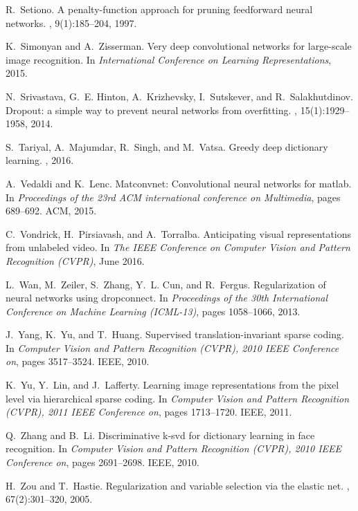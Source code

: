 \documentclass[10pt,twocolumn,letterpaper]{article}
\begin{document}
\begin{thebibliography}{10}
R.~Setiono.
\newblock A penalty-function approach for pruning feedforward neural networks.
, 9(1):185--204, 1997.

K.~Simonyan and A.~Zisserman.
\newblock Very deep convolutional networks for large-scale image recognition.
\newblock In {\em International Conference on Learning Representations}, 2015.

N.~Srivastava, G.~E. Hinton, A.~Krizhevsky, I.~Sutskever, and R.~Salakhutdinov.
\newblock Dropout: a simple way to prevent neural networks from overfitting.
, 15(1):1929--1958, 2014.

S.~Tariyal, A.~Majumdar, R.~Singh, and M.~Vatsa.
\newblock Greedy deep dictionary learning.
, 2016.

A.~Vedaldi and K.~Lenc.
\newblock Matconvnet: Convolutional neural networks for matlab.
\newblock In {\em Proceedings of the 23rd ACM international conference on
  Multimedia}, pages 689--692. ACM, 2015.

C.~Vondrick, H.~Pirsiavash, and A.~Torralba.
\newblock Anticipating visual representations from unlabeled video.
\newblock In {\em The IEEE Conference on Computer Vision and Pattern
  Recognition (CVPR)}, June 2016.

L.~Wan, M.~Zeiler, S.~Zhang, Y.~L. Cun, and R.~Fergus.
\newblock Regularization of neural networks using dropconnect.
\newblock In {\em Proceedings of the 30th International Conference on Machine
  Learning (ICML-13)}, pages 1058--1066, 2013.

J.~Yang, K.~Yu, and T.~Huang.
\newblock Supervised translation-invariant sparse coding.
\newblock In {\em Computer Vision and Pattern Recognition (CVPR), 2010 IEEE
  Conference on}, pages 3517--3524. IEEE, 2010.

K.~Yu, Y.~Lin, and J.~Lafferty.
\newblock Learning image representations from the pixel level via hierarchical
  sparse coding.
\newblock In {\em Computer Vision and Pattern Recognition (CVPR), 2011 IEEE
  Conference on}, pages 1713--1720. IEEE, 2011.

Q.~Zhang and B.~Li.
\newblock Discriminative k-svd for dictionary learning in face recognition.
\newblock In {\em Computer Vision and Pattern Recognition (CVPR), 2010 IEEE
  Conference on}, pages 2691--2698. IEEE, 2010.

H.~Zou and T.~Hastie.
\newblock Regularization and variable selection via the elastic net.
, 67(2):301--320, 2005.

\end{thebibliography}
\end{document}
